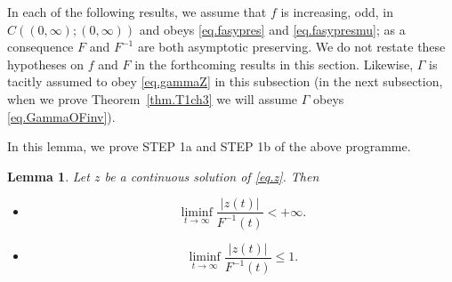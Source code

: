 \documentclass[a4paper,10pt,reqno]{amsart}
\numberwithin{equation}{section}
\newtheorem{lemma}{Lemma}
\theoremstyle{definition}
\theoremstyle{remark}
\DeclareMathOperator{\1}{\mathbbm 1}
\begin{document}
	In each of the following results, we assume that $f$ is increasing, odd, in $C((0,\infty);(0,\infty))$ and obeys \eqref{eq.fasypres} and \eqref{eq.fasypresmu}; as a consequence $F$ and $F^{-1}$ are both asymptotic preserving. We do not restate these hypotheses on $f$ and $F$ in the forthcoming results in this section. Likewise, $\Gamma$ is tacitly assumed to obey \eqref{eq.gammaZ} in this subsection (in the next subsection, when we prove Theorem~\ref{thm.T1ch3} we will assume $\Gamma$ obeys \eqref{eq.GammaOFinv}).
	
	In this lemma, we prove STEP 1a and STEP 1b of the above programme.  
	\begin{lemma} \label{lemma.step1zsimFinv}
		Let $z$ be a continuous solution of \eqref{eq.z}. Then
		\begin{itemize}
			\item[(i)] 
			\[
			\liminf_{t\to\infty} \frac{|z(t)|}{F^{-1}(t)}<+\infty.
			\] 
			\item[(ii)] 
			\[
			\liminf_{t\to\infty} \frac{|z(t)|}{F^{-1}(t)}\leq 1.
			\] 
		\end{itemize}	
	\end{lemma}
\end{document}
